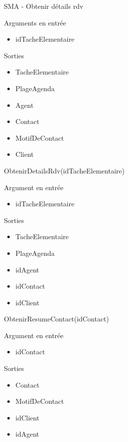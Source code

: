 \documentclass[xetex]{beamer}
\begin{document}
\begin{frame}{SMA - Obtenir détails rdv}

\begin{small}
\noindent Arguments en entrée
\begin{itemize}
\item idTacheElementaire \\
\end{itemize}

\noindent Sorties
\begin{itemize}
\item TacheElementaire
\item PlageAgenda 
\item Agent
\item Contact
\item MotifDeContact 
\item Client 
\end{itemize}
\end{small}

\end{frame}
    
\begin{frame}{ObtenirDetailsRdv(idTacheElementaire)}

\noindent  Argument en entrée
\begin{itemize}
\item idTacheElementaire  \\
\end{itemize}

\noindent Sorties 
\begin{itemize}
\item TacheElementaire
\item PlageAgenda 
\item idAgent  
\item idContact
\item idClient 
\end{itemize}

\end{frame}

\begin{frame}{ObtenirResumeContact(idContact)}

\noindent  Argument en entrée
\begin{itemize}
\item idContact \\
\end{itemize}

\noindent Sorties
\begin{itemize}
\item Contact  
\item MotifDeContact  
\item idClient
\item idAgent
\end{itemize}

\end{frame}
\end{document}
